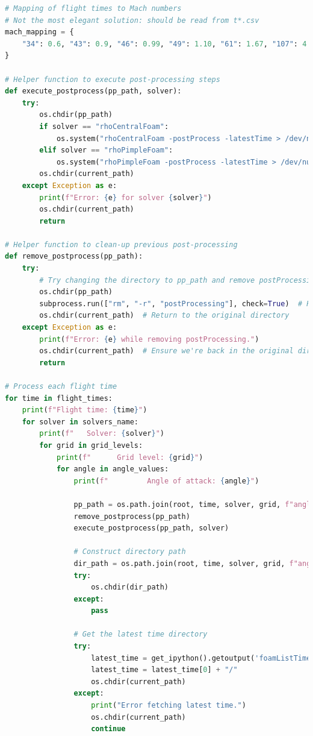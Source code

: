 \documentclass[12pt]{article}
\begin{document}
\begin{lstlisting}[language=Python, caption=Python script used to post-process numerical solutions. To report bugs email to: lorenzo.campoli@gspace.com, label=lst:pp]
# Mapping of flight times to Mach numbers
# Not the most elegant solution: should be read from t*.csv
mach_mapping = {
    "34": 0.6, "43": 0.9, "46": 0.99, "49": 1.10, "61": 1.67, "107": 4.51
}
        
# Helper function to execute post-processing steps
def execute_postprocess(pp_path, solver):
    try:
        os.chdir(pp_path)
        if solver == "rhoCentralFoam":
            os.system("rhoCentralFoam -postProcess -latestTime > /dev/null 2>&1")
        elif solver == "rhoPimpleFoam":
            os.system("rhoPimpleFoam -postProcess -latestTime > /dev/null 2>&1")
        os.chdir(current_path)
    except Exception as e:
        print(f"Error: {e} for solver {solver}")
        os.chdir(current_path)
        return

# Helper function to clean-up previous post-processing
def remove_postprocess(pp_path):
    try:
        # Try changing the directory to pp_path and remove postProcessing folder if it exists
        os.chdir(pp_path)
        subprocess.run(["rm", "-r", "postProcessing"], check=True)  # Remove postProcessing
        os.chdir(current_path)  # Return to the original directory
    except Exception as e:
        print(f"Error: {e} while removing postProcessing.")
        os.chdir(current_path)  # Ensure we're back in the original directory
        return
        
# Process each flight time
for time in flight_times:
    print(f"Flight time: {time}")
    for solver in solvers_name:
        print(f"   Solver: {solver}")
        for grid in grid_levels:
            print(f"      Grid level: {grid}")
            for angle in angle_values:
                print(f"         Angle of attack: {angle}")
                
                pp_path = os.path.join(root, time, solver, grid, f"angle_{angle}")
                remove_postprocess(pp_path)
                execute_postprocess(pp_path, solver)
                
                # Construct directory path
                dir_path = os.path.join(root, time, solver, grid, f"angle_{angle}", file_path)
                try:
                    os.chdir(dir_path)
                except:
                    pass
                
                # Get the latest time directory
                try:
                    latest_time = get_ipython().getoutput('foamListTimes -latestTime -withZero | tail -n 1')
                    latest_time = latest_time[0] + "/"
                    os.chdir(current_path)
                except:
                    print("Error fetching latest time.")
                    os.chdir(current_path)
                    continue
    

\end{lstlisting}
\end{document}

